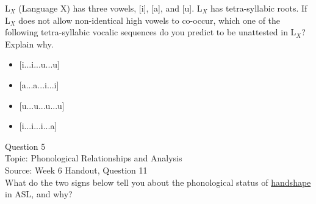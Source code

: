 \documentclass[12pt]{article}
\begin{document}
L$_X$ (Language X) has three vowels, [i], [a], and [u]. L$_X$ has tetra-syllabic roots. If L$_X$ does not allow non-identical high vowels to co-occur, which one of the following tetra-syllabic vocalic sequences do you predict to be unattested in L$_X$? Explain why.\\

\begin{itemize} \item {[i...i...u...u]} \item {[a...a...i...i]} \item {[u...u...u...u]} \item {[i...i...i...a]} \end{itemize}


\newpage

{\large Question 5}\\

Topic: Phonological Relationships and Analysis\\
Source: Week 6 Handout, Question 11\\

What do the two signs below tell you about the phonological status of \underline{handshape} in ASL, and why?\\
\end{document}
